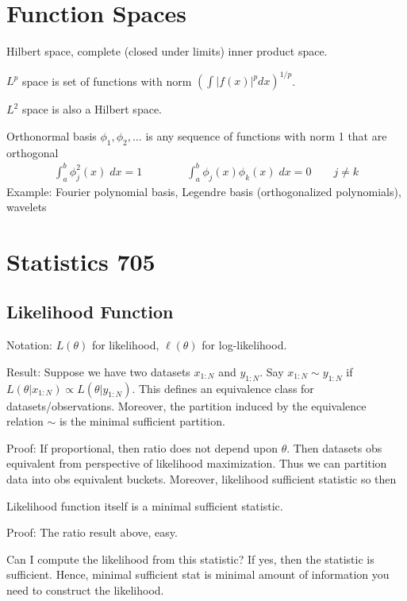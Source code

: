 \documentclass[12pt]{article}
\theoremstyle{plain}
\theoremstyle{definition}
\theoremstyle{remark}
\begin{document}
\clearpage
\section{Function Spaces}

Hilbert space, complete (closed under limits) inner product space.

$L^p$ space is set of functions with norm
$\left(\int |f(x)|^p dx\right)^{1/p}$.

$L^2$ space is also a Hilbert space.

Orthonormal basis $\phi_1,\phi_2,\ldots$ is any sequence of functions
with norm 1 that are orthogonal
\begin{align*}
  \int^b_a \phi_j^2(x)\;dx=1
  \qquad
  \qquad
  \int^b_a \phi_j(x)\phi_k(x)\;dx=0
  \qquad
  j\neq k
\end{align*}
Example: Fourier polynomial basis, Legendre basis (orthogonalized
polynomials), wavelets




\clearpage
\section{Statistics 705}







\subsection{Likelihood Function}

Notation: $L(\theta)$ for likelihood, $\ell(\theta)$ for log-likelihood.

Result:
Suppose we have two datasets $x_{1:N}$ and $y_{1:N}$.
Say $x_{1:N}\sim y_{1:N}$ if
$L(\theta|x_{1:N})\propto L(\theta|y_{1:N})$.
This defines an equivalence class for datasets/observations.
Moreover, the partition induced by the equivalence relation $\sim$ is
the minimal sufficient partition.

Proof:
If proportional, then ratio does not depend upon $\theta$.
Then datasets obs equivalent from perspective of likelihood
maximization.
Thus we can partition data into obs equivalent buckets.
Moreover, likelihood sufficient statistic so then

Likelihood function itself is a minimal sufficient statistic.

Proof:
The ratio result above, easy.

Can I compute the likelihood from this statistic? If yes, then the
statistic is sufficient.
Hence, minimal sufficient stat is minimal amount of information you need
to construct the likelihood.
\end{document}
